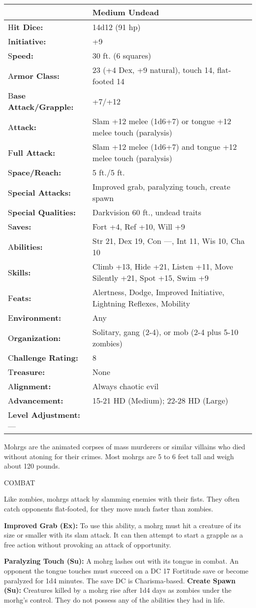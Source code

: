 \documentclass{article}
\begin{document}
\begin{tabular}{|>{\raggedright}p{85pt}|>{\raggedright}p{240pt}|}
\hline
  & Medium Undead\tabularnewline
\hline
H\textbf{it Dice:} & 14d12 (91 hp)\tabularnewline
\hline
I\textbf{nitiative:} & +9\tabularnewline
\hline
S\textbf{peed:} & 30 ft. (6 squares)\tabularnewline
\hline
A\textbf{rmor Class:} & 23 (+4 Dex, +9 natural), touch 14, flat-footed 14\tabularnewline
\hline
B\textbf{ase Attack/Grapple:} & +7/+12\tabularnewline
\hline
A\textbf{ttack:} & Slam +12 melee (1d6+7) or tongue +12 melee touch (paralysis)\tabularnewline
\hline
F\textbf{ull Attack:} & Slam +12 melee (1d6+7) and tongue +12 melee touch (paralysis)\tabularnewline
\hline
S\textbf{pace/Reach:} & 5 ft./5 ft.\tabularnewline
\hline
S\textbf{pecial Attacks:} & Improved grab, paralyzing touch, create spawn\tabularnewline
\hline
S\textbf{pecial Qualities:} & Darkvision 60 ft., undead traits\tabularnewline
\hline
S\textbf{aves:} & Fort +4, Ref +10, Will +9\tabularnewline
\hline
A\textbf{bilities:} & Str 21, Dex 19, Con ---, Int 11, Wis 10, Cha 10\tabularnewline
\hline
S\textbf{kills:} & Climb +13, Hide +21, Listen +11, Move Silently +21, Spot +15, 
Swim +9\tabularnewline
\hline
F\textbf{eats:} & Alertness, Dodge, Improved Initiative, Lightning Reflexes, Mobility\tabularnewline
\hline
E\textbf{nvironment:} & Any\tabularnewline
\hline
O\textbf{rganization:} & Solitary, gang (2-4), or mob (2-4 plus 5-10 zombies)\tabularnewline
\hline
C\textbf{hallenge Rating:} & 8\tabularnewline
\hline
T\textbf{reasure:} & None\tabularnewline
\hline
A\textbf{lignment:} & Always chaotic evil\tabularnewline
\hline
A\textbf{dvancement:} & 15-21 HD (Medium); 22-28 HD (Large)\tabularnewline
\hline
L\textbf{evel Adjustment:}--- & \tabularnewline
\hline
\end{tabular}

Mohrgs are the animated corpses of mass murderers or similar villains who died 
without atoning for their crimes. Most mohrgs are 5 to 6 feet tall and weigh about 
120 pounds.

COMBAT

Like zombies, mohrgs attack by slamming enemies with their fists. They often catch 
opponents flat-footed, for they move much faster than zombies.

\textbf{Improved Grab (Ex): }To use this ability, a mohrg must hit a creature of 
its size or smaller with its slam attack. It can then attempt to start a grapple 
as a free action without provoking an attack of opportunity.

\textbf{Paralyzing Touch (Su): }A mohrg lashes out with its tongue in combat. An 
opponent the tongue touches must succeed on a DC 17 Fortitude save or become paralyzed 
for 1d4 minutes. The save DC is Charisma-based. \textbf{Create Spawn (Su): }Creatures 
killed by a mohrg rise after 1d4 days as zombies under the morhg's control. They 
do not possess any of the abilities they had in life.
\end{document}
